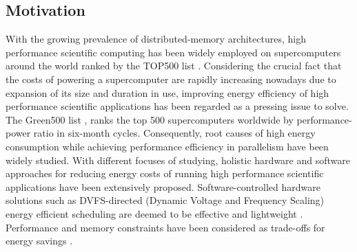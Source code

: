 \documentclass[12pt]{elsarticle}
\begin{document}
\subsection{Motivation}

With the growing prevalence of distributed-memory architectures, high performance scientific computing has been widely employed on supercomputers around the world ranked by the TOP500 list \cite{top500}. Considering the crucial fact that the costs of powering a supercomputer are rapidly increasing nowadays due to expansion of its size and duration in use, improving energy efficiency of high performance scientific applications has been regarded as a pressing issue to solve. The Green500 list \cite{green500}, ranks the top 500 supercomputers worldwide by performance-power ratio in six-month cycles. Consequently, root causes of high energy consumption while achieving performance efficiency in parallelism have been widely studied. With different focuses of studying, holistic hardware and software approaches for reducing energy costs of running high performance scientific applications have been extensively proposed. Software-controlled hardware solutions such as DVFS-directed (Dynamic Voltage and Frequency Scaling) energy efficient scheduling are deemed to be effective and lightweight \cite{ipdps05a} \cite{ppopp05} \cite{sc05a} \cite{sc05b} \cite{ppopp06a} \cite{sc07} \cite{ics09}. Performance and memory constraints have been considered as trade-offs for energy savings \cite{ccgrid07} \cite{icpp07} \cite{rtas09} \cite{ipccc13} \cite{iccs14}.
\end{document}
